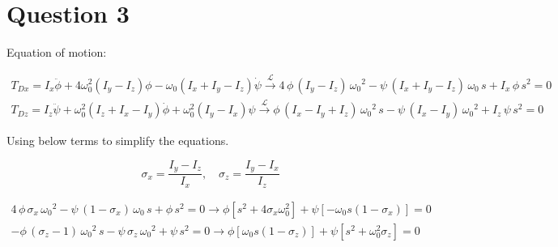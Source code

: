 \section{Question 3}
Equation of motion:

\begin{equation*}
    \begin{split}
    T_{Dx} = I_x \ddot{\phi} + 4\omega_0^2\left(I_y-I_z\right)\phi- \omega_0\left(I_x + I_y - I_z\right) \dot \psi \xrightarrow{\mathscr{L}}
    4\,\phi \,{\left(I_y -I_z \right)}\,{\omega_0 }^2 -\psi \,{\left(I_x +I_y -I_z \right)}\,\omega_0 \,s+I_x \,\phi \,s^2 =0
    \\
    T_{Dz} = I_z \ddot{\psi} + \omega_0^2\left(I_z+I_x-I_y\right)\dot \phi+ \omega_0^2\left(I_y - I_x\right) \psi \xrightarrow{\mathscr{L}} \phi \,{\left(I_x -I_y +I_z \right)}\,{\omega_0 }^2 \,s-\psi \,{\left(I_x -I_y \right)}\,{\omega_0 }^2 +I_z \,\psi \,s^2 =0
    \end{split}
\end{equation*}

Using below terms to simplify the equations.

$$
\sigma_x = \dfrac{I_y-I_z}{I_x}, \quad \sigma_z = \dfrac{I_y-I_x}{I_z}
$$

\begin{equation}
    \begin{split}
        4\,\phi \,\sigma_x \,{\omega_0 }^2 -\psi \,{\left(1-\sigma_x \right)}\,\omega_0 \,s+\phi \,s^2 =0\to \phi [s^2+4\sigma_x\omega_0^2] + \psi[-\omega_0s(1-\sigma_x)] = 0\\
        -\phi \,{\left(\sigma_z -1\right)}\,{\omega_0 }^2 \,s-\psi \,\sigma_z \,{\omega_0 }^2 +\psi \,s^2 =0\to \phi[\omega_0s(1-\sigma_z)]+ \psi[s^2+\omega_0^2\sigma_z] = 0
    \end{split}
\end{equation}

